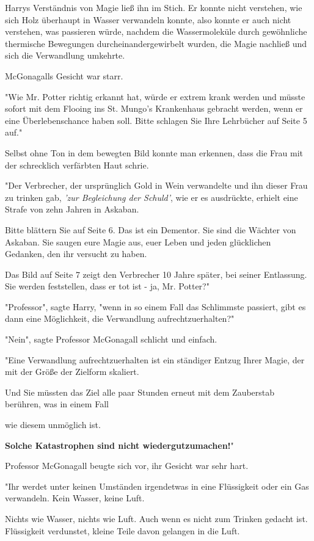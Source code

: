 {Harrys Verständnis von Magie ließ ihn im Stich. Er konnte nicht verstehen, wie sich Holz überhaupt in Wasser verwandeln konnte, also konnte er auch nicht verstehen, was passieren würde, nachdem die Wassermoleküle durch gewöhnliche thermische Bewegungen durcheinandergewirbelt wurden, die Magie nachließ und sich die Verwandlung umkehrte.

McGonagalls Gesicht war starr.

"Wie Mr. Potter richtig erkannt hat, würde er extrem krank werden und müsste sofort mit dem Flooing ins St. Mungo's Krankenhaus gebracht werden, wenn er eine Überlebenschance haben soll. Bitte schlagen Sie Ihre Lehrbücher auf Seite 5 auf."

Selbst ohne Ton in dem bewegten Bild konnte man erkennen, dass die Frau mit der schrecklich verfärbten Haut schrie.

"Der Verbrecher, der ursprünglich Gold in Wein verwandelte und ihn dieser Frau zu trinken gab, \emph{'zur Begleichung der Schuld'}, wie er es ausdrückte, erhielt eine Strafe von zehn Jahren in Askaban.

Bitte blättern Sie auf Seite 6. Das ist ein Dementor. Sie sind die Wächter von Askaban. Sie saugen eure Magie aus, euer Leben und jeden glücklichen Gedanken, den ihr versucht zu haben.

Das Bild auf Seite 7 zeigt den Verbrecher 10 Jahre später, bei seiner Entlassung. Sie werden feststellen, dass er tot ist - ja, Mr. Potter?"

"Professor", sagte Harry, "wenn in so einem Fall das Schlimmste passiert, gibt es dann eine Möglichkeit, die Verwandlung aufrechtzuerhalten?"

"Nein", sagte Professor McGonagall schlicht und einfach.

"Eine Verwandlung aufrechtzuerhalten ist ein ständiger Entzug Ihrer Magie, der mit der Größe der Zielform skaliert.

Und Sie müssten das Ziel alle paar Stunden erneut mit dem Zauberstab berühren, was in einem Fall

wie diesem unmöglich ist.

\textbf{Solche Katastrophen sind nicht wiedergutzumachen!}"

Professor McGonagall beugte sich vor, ihr Gesicht war sehr hart.

"Ihr werdet unter keinen Umständen irgendetwas in eine Flüssigkeit oder ein Gas verwandeln. Kein Wasser, keine Luft.

Nichts wie Wasser, nichts wie Luft. Auch wenn es nicht zum Trinken gedacht ist. Flüssigkeit verdunstet, kleine Teile davon gelangen in die Luft.

}
